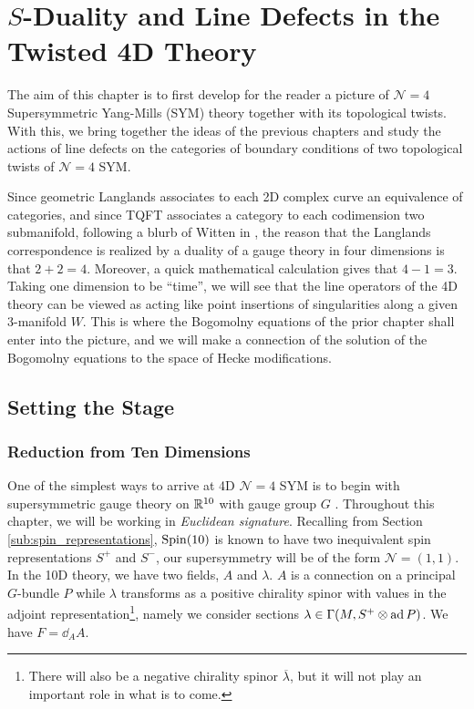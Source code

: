 \chapter{$S$-Duality and Line Defects in the Twisted 4D Theory\label{ch:finale}}

The aim of this chapter is to first develop for the reader a picture of $\mathcal N = 4$ Supersymmetric Yang-Mills (SYM) theory together with its topological twists. With this, we bring together the ideas of the previous chapters and study the actions of line defects on the categories of boundary conditions of two topological twists of $\mathcal N=4$ SYM.

	Since geometric Langlands associates to each 2D complex curve an equivalence of categories, and since TQFT associates a category to each codimension two submanifold, following a blurb of Witten in \cite{witten2017}, the reason that the Langlands correspondence is realized by a duality of a gauge theory in four dimensions is that $2+2=4$. Moreover, a quick mathematical calculation gives that $4-1 = 3$. Taking one dimension to be ``time'', we will see that the line operators of the 4D theory can be viewed as acting like point insertions of singularities along a given 3-manifold $W$. This is where the Bogomolny equations of the prior chapter shall enter into the picture, and we will make a connection of the solution of the Bogomolny equations to the space of Hecke modifications.

\section{Setting the Stage} %
\label{sec:setting_the_stage}

\subsection{Reduction from Ten Dimensions} %
\label{sub:reduction_from_ten_dimensions}

One of the simplest ways to arrive at 4D $\mathcal N=4$ SYM is to begin with supersymmetric gauge theory on $\mathbb{R}^{10}$ with gauge group $G$ \cite{kapustin2006}. Throughout this chapter, we will be working in \emph{Euclidean signature}. Recalling from Section \ref{sub:spin_representations}, $\mathrm{Spin}(10)$ is known to have two inequivalent spin representations $S^+$ and $S^-$, our supersymmetry will be of the form $\mathcal N = (1, 1)$. In the 10D theory, we have two fields, $A$ and $\lambda$. $A$ is a connection on a principal $G$-bundle $P$ while $\lambda$ transforms as a positive chirality spinor with values in the adjoint representation\footnote{There will also be a negative chirality spinor $\overline \lambda$, but it will not play an important role in what is to come.}, namely we consider sections $\lambda \in \Gamma(M, S^+ \otimes \mathrm{ad}\, P)$. We have $F = \dd_{A} A$.

